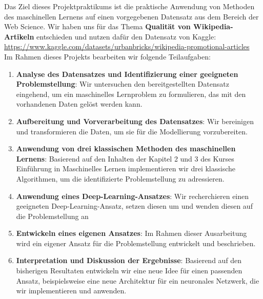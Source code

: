 Das Ziel dieses Projektpraktikums ist die praktische Anwendung von Methoden des maschinellen Lernens auf einen vorgegebenen Datensatz aus dem Bereich der Web Science. Wir haben uns für das Thema \textbf{Qualität von Wikipedia-Artikeln} entschieden und nutzen dafür den Datensatz von Kaggle: \url{https://www.kaggle.com/datasets/urbanbricks/wikipedia-promotional-articles}\\
Im Rahmen dieses Projekts bearbeiten wir folgende Teilaufgaben:

\begin{enumerate} 
\item \textbf{Analyse des Datensatzes und Identifizierung einer geeigneten Problemstellung}: Wir untersuchen den bereitgestellten Datensatz eingehend, um ein maschinelles Lernproblem zu formulieren, das mit den vorhandenen Daten gelöst werden kann. 
\item \textbf{Aufbereitung und Vorverarbeitung des Datensatzes}: Wir bereinigen und transformieren die Daten, um sie für die Modellierung vorzubereiten. 
\item \textbf{Anwendung von drei klassischen Methoden des maschinellen Lernens}: Basierend auf den Inhalten der Kapitel 2 und 3 des Kurses \glqq Einführung in Maschinelles Lernen\grqq{} implementieren wir drei klassische Algorithmen, um die identifizierte Problemstellung zu adressieren. 
\item \textbf{Anwendung eines Deep-Learning-Ansatzes}: Wir recherchieren einen geeigneten Deep-Learning-Ansatz, setzen diesen um und wenden diesen auf die Problemstellung an
\item \textbf{Entwickeln eines eigenen Ansatzes}: Im Rahmen dieser Ausarbeitung wird ein eigener Ansatz für die Problemstellung entwickelt und beschrieben. 
\item \textbf{Interpretation und Diskussion der Ergebnisse}: Basierend auf den bisherigen Resultaten entwickeln wir eine neue Idee für einen passenden Ansatz, beispielsweise eine neue Architektur für ein neuronales Netzwerk, die wir implementieren und anwenden. \end{enumerate}